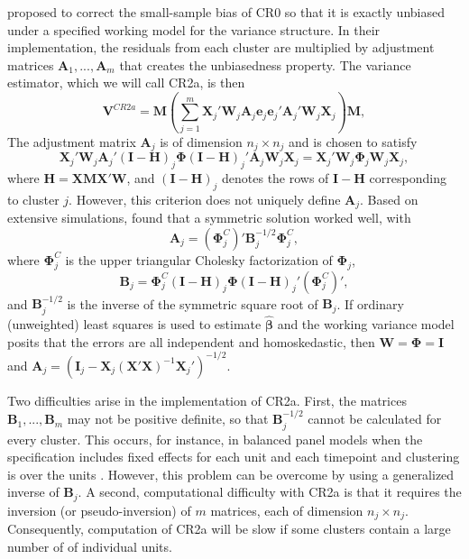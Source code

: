 \documentclass[12pt]{article}\usepackage[]{graphicx}\usepackage[]{color}
\newcommand{\bm}{\mathbf}
\newcommand{\bs}{\boldsymbol}
\begin{document}
\citet[see also \citealp{Bell2002bias}]{McCaffrey2001generalizations} proposed to correct the small-sample bias of CR0 so that it is exactly unbiased under a specified working model for the variance structure. 
In their implementation, the residuals from each cluster are multiplied by adjustment matrices $\bm{A}_1,...,\bm{A}_m$ that creates the unbiasedness property. 
The variance estimator, which we will call CR2a, is then 
\begin{equation}
\label{eq:V_CR2a}
\bm{V}^{CR2a} = \bm{M}\left(\sum_{j=1}^m \bm{X}_j'\bm{W}_j \bm{A}_j \bm{e}_j \bm{e}_j' \bm{A}_j' \bm{W}_j \bm{X}_j\right) \bm{M},
\end{equation}
The adjustment matrix $\bm{A}_j$ is of dimension $n_j \times n_j$ and is chosen to satisfy
\begin{equation}
\label{eq:CR2a_criterion}
\bm{X}_j' \bm{W}_j \bm{A}_j' \left(\bm{I} - \bm{H}\right)_j \bs\Phi \left(\bm{I} - \bm{H}\right)_j' \bm{A}_j \bm{W}_j \bm{X}_j = \bm{X}_j' \bm{W}_j \bs\Phi_j \bm{W}_j \bm{X}_j,
\end{equation}
where $\bm{H} = \bm{X}\bm{M}\bm{X}'\bm{W}$, and $\left(\bm{I} - \bm{H}\right)_j$ denotes the rows of $\bm{I} - \bm{H}$ corresponding to cluster $j$. 
However, this criterion does not uniquely define $\bm{A}_j$. 
Based on extensive simulations, \citet{McCaffrey2001generalizations} found that a symmetric solution worked well, with 
\begin{equation}
\label{eq:CR2a_adjustment}
\bm{A}_j = \left(\bs\Phi_j^C\right)' \bm{B}_j^{-1/2}\bs\Phi_j^C,
\end{equation}
where $\bs\Phi_j^C$ is the upper triangular Cholesky factorization of $\bs\Phi_j$, 
\begin{equation}
\label{eq:CR2a_Bmatrix}
\bm{B}_j = \bs\Phi_j^C\left(\bm{I} - \bm{H}\right)_j \bs\Phi \left(\bm{I} - \bm{H}\right)_j' \left(\bs\Phi_j^C\right)',
\end{equation}
and $\bm{B}_j^{-1/2}$ is the inverse of the symmetric square root of $\bm{B}_j $. 
If ordinary (unweighted) least squares is used to estimate $\bs{\hat\beta}$ and the working variance model posits that the errors are all independent and homoskedastic, then $\bm{W} = \bs\Phi = \bm{I}$ and $\bm{A}_j = \left(\bm{I}_j - \bm{X}_j\left(\bm{X}'\bm{X}\right)^{-1}\bm{X}_j'\right)^{-1/2}$.

Two difficulties arise in the implementation of CR2a.
First, the matrices $\bm{B}_1,...,\bm{B}_m$ may not be positive definite, so that $\bm{B}_j^{-1/2}$ cannot be calculated for every cluster. 
This occurs, for instance, in balanced panel models when the specification includes fixed effects for each unit and each timepoint and clustering is over the units \citep[p. 320]{Angrist2009mostly}. 
However, this problem can be overcome by using a generalized inverse of $\bm{B}_j$. 
A second, computational difficulty with CR2a is that it requires the inversion (or pseudo-inversion) of $m$ matrices, each of dimension $n_j \times n_j$. 
Consequently, computation of CR2a will be slow if some clusters contain a large number of of individual units. 
\end{document}

